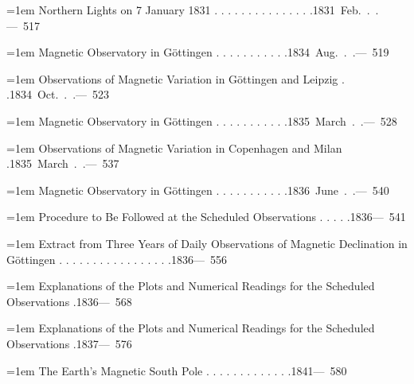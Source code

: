 \noindent\hangindent=1em Northern Lights on 7 January 1831 . . . . . . . . . . . . . . .\unskip\hspace{1em plus 1fill}\mbox{1831 Feb. . .\quad — 517}\par\smallskip
\noindent\hangindent=1em Magnetic Observatory in Göttingen . . . . . . . . . . .\unskip\hspace{1em plus 1fill}\mbox{1834 Aug. . .\quad — 519}\par\smallskip
\noindent\hangindent=1em Observations of Magnetic Variation in Göttingen and Leipzig . .\unskip\hspace{1em plus 1fill}\mbox{1834 Oct. . .\quad — 523}\par\smallskip
\noindent\hangindent=1em Magnetic Observatory in Göttingen . . . . . . . . . . .\unskip\hspace{1em plus 1fill}\mbox{1835 March . .\quad — 528}\par\smallskip
\noindent\hangindent=1em Observations of Magnetic Variation in Copenhagen and Milan .\unskip\hspace{1em plus 1fill}\mbox{1835 March . .\quad — 537}\par\smallskip
\noindent\hangindent=1em Magnetic Observatory in Göttingen . . . . . . . . . . .\unskip\hspace{1em plus 1fill}\mbox{1836 June . .\quad — 540}\par\smallskip
\noindent\hangindent=1em Procedure to Be Followed at the Scheduled Observations . . . . .\unskip\hspace{1em plus 1fill}\mbox{1836\quad — 541}\par\smallskip
\noindent\hangindent=1em Extract from Three Years of Daily Observations of Magnetic Declination in Göttingen . . . . . . . . . . . . . . . . .\unskip\hspace{1em plus 1fill}\mbox{1836\quad — 556}\par\smallskip
\noindent\hangindent=1em Explanations of the Plots and Numerical Readings for the Scheduled Observations .\unskip\hspace{1em plus 1fill}\mbox{1836\quad — 568}\par\smallskip
\noindent\hangindent=1em Explanations of the Plots and Numerical Readings for the Scheduled Observations .\unskip\hspace{1em plus 1fill}\mbox{1837\quad — 576}\par\smallskip
\noindent\hangindent=1em The Earth’s Magnetic South Pole . . . . . . . . . . . . .\unskip\hspace{1em plus 1fill}\mbox{1841\quad — 580}\par\smallskip
